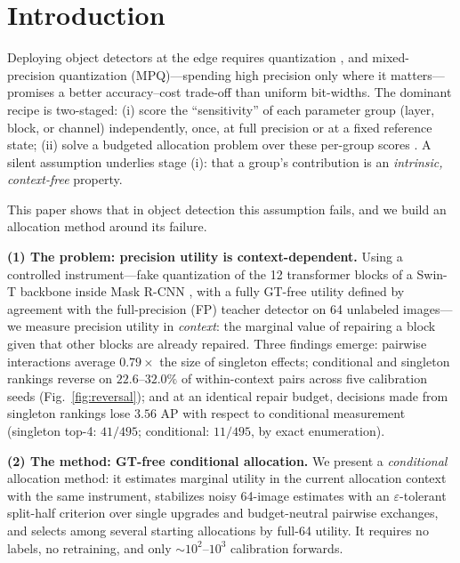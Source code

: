 \section{Introduction}
\label{sec:intro}

Deploying object detectors at the edge requires quantization
\cite{jacob2018quant,gholami2022survey}, and
mixed-precision quantization (MPQ)---spending high precision only where
it matters---promises a better accuracy--cost trade-off than uniform
bit-widths. The dominant recipe is two-staged: (i) score the
``sensitivity'' of each parameter group (layer, block, or channel)
independently, once, at full precision or at a fixed reference state;
(ii) solve a budgeted allocation problem over these per-group scores
\cite{hawq,haq,bitsplit,flbq,lampq,blobq,regptq}. A silent assumption
underlies stage (i): that a group's contribution is an
\emph{intrinsic, context-free} property.

This paper shows that in object detection this assumption fails, and we
build an allocation method around its failure.

\smallskip
\noindent\textbf{(1) The problem: precision utility is context-dependent.}
  Using a controlled instrument---fake quantization of the 12 transformer
  blocks of a Swin-T backbone inside Mask R-CNN \cite{maskrcnn,swin}, with
a fully GT-free utility defined by agreement with the full-precision (FP)
teacher detector on 64 unlabeled images---we measure precision utility in
\emph{context}: the marginal value of repairing a block given that other
blocks are already repaired. Three findings emerge: pairwise interactions
average $0.79\times$ the size of singleton effects; conditional and
singleton rankings reverse on $22.6$--$32.0\%$ of within-context pairs
across five calibration seeds (Fig.~\ref{fig:reversal}); and at an
identical repair budget, decisions made from singleton rankings lose
$3.56$ AP with respect to conditional measurement (singleton top-4:
$41/495$; conditional: $11/495$, by exact enumeration).

\smallskip
\noindent\textbf{(2) The method: GT-free conditional allocation.}
We present a \emph{conditional} allocation method: it estimates marginal
utility in the current allocation context with the same instrument,
stabilizes noisy 64-image estimates with an $\varepsilon$-tolerant
split-half criterion over single upgrades and budget-neutral pairwise
exchanges, and selects among several starting allocations by full-64
utility. It requires no labels, no retraining, and only
$\sim\!10^{2}$--$10^{3}$ calibration forwards.


